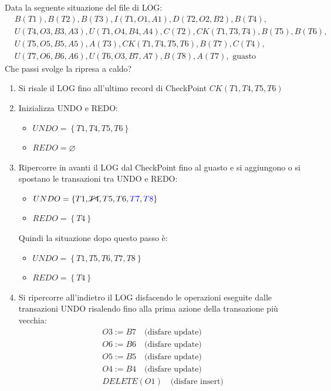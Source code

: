 \documentclass[a4paper]{article}
\begin{document}
\begin{exercise}
  Data la seguente situazione del file di LOG:
  \[
    \begin{aligned}
      &B(T1), B(T2), B(T3), I(T1,O1,A1), D(T2,O2,B2), B(T4), \\ 
      &U(T4,O3,B3,A3), U(T1,O4,B4,A4), C(T2), CK(T1,T3,T4), B(T5), B(T6), \\ 
      &U(T5,O5,B5,A5), A(T3), CK(T1,T4,T5,T6), B(T7), C(T4), \\
      &U(T7,O6,B6,A6), U(T6,O3,B7,A7), B(T8), A(T7), \text{ guasto}
    \end{aligned}
  \]
  Che passi svolge la ripresa a caldo?

  \begin{enumerate}
    \item Si risale il LOG fino all'ultimo record di CheckPoint \( CK(T1,T4,T5,T6) \)
    \item Inizializza UNDO e REDO:
      \begin{itemize}
        \item \( UNDO = \left\{ T1, T4, T5, T6 \right\} \)
        \item \( REDO = \varnothing \)
      \end{itemize}

    \item Ripercorre in avanti il LOG dal CheckPoint fino al guasto e si aggiungono
      o si spostano le transazioni tra UNDO e REDO:
      \begin{itemize}
        \item \( UNDO = \left\{ T1, \cancel{T4}, T5, T6, \color{blue}T7\color{black}, \color{blue}T8\color{black} \right\} \) 
        \item \( REDO = \left\{ T4 \right\} \) 
      \end{itemize}
      Quindi la situazione dopo questo passo è:
      \begin{itemize}
        \item \( UNDO = \left\{ T1, T5, T6, T7, T8 \right\} \) 
        \item \( REDO = \left\{ T4 \right\} \) 
      \end{itemize}

    \item Si ripercorre all'indietro il LOG disfacendo le operazioni eseguite dalle
      transazioni UNDO risalendo fino alla prima azione della transazione più vecchia:
      \[
        \begin{aligned}
          &O3 := B7 \quad \text{(disfare update)}\\
          &O6 := B6 \quad \text{(disfare update)}\\
          &O5 := B5 \quad \text{(disfare update)}\\
          &O4 := B4 \quad \text{(disfare update)}\\
          &DELETE(O1) \quad \text{(disfare insert)}
        \end{aligned}
      \] 


\end{enumerate}
\end{exercise}
\end{document}
